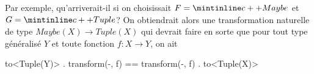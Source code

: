 Par exemple, qu'arriverait-il si on choisissait $F = \icpp{Maybe}$ et $G = \icpp{Tuple}$?
On obtiendrait alors une transformation naturelle  de
type $Maybe(X) \to Tuple(X)$ qui devrait faire en sorte que pour tout type
généralisé $Y$ et toute fonction $f : X \to Y$, on ait
\begin{cpp}
    to<Tuple(Y)> . transform(-, f) == transform(-, f) . to<Tuple(X)>
\end{cpp}

